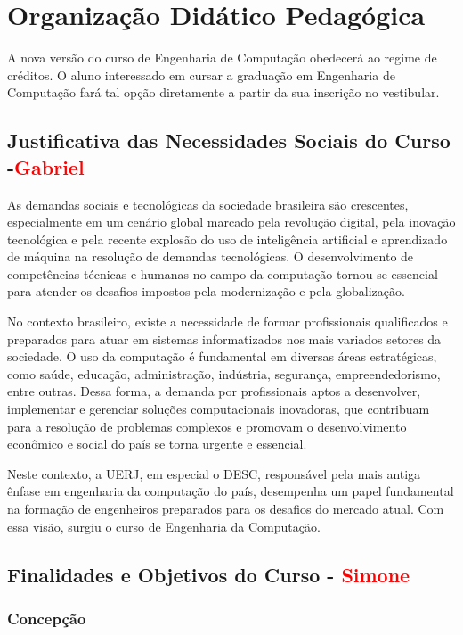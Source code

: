 
\chapter{Organização Didático Pedagógica}

A nova versão do curso de Engenharia de Computação obedecerá ao regime de créditos. O aluno interessado em cursar a graduação em Engenharia de Computação fará tal opção diretamente a partir da sua inscrição no vestibular.


\section{Justificativa das Necessidades Sociais do Curso -\textcolor{red}{Gabriel}}

As demandas sociais e tecnológicas da sociedade brasileira são crescentes, especialmente em um cenário global marcado pela revolução digital, pela inovação tecnológica e pela recente explosão do uso de inteligência artificial e aprendizado de máquina na resolução de demandas tecnológicas. O desenvolvimento de competências técnicas e humanas no campo da computação tornou-se essencial para atender os desafios impostos pela modernização e pela globalização.

No contexto brasileiro, existe a necessidade de formar profissionais qualificados e preparados para atuar em sistemas informatizados nos mais variados setores da sociedade. O uso da computação é fundamental em diversas áreas estratégicas, como saúde, educação, administração, indústria, segurança, empreendedorismo, entre outras. Dessa forma, a demanda por profissionais aptos a desenvolver, implementar e gerenciar soluções computacionais inovadoras, que contribuam para a resolução de problemas complexos e promovam o desenvolvimento econômico e social do país se torna urgente e essencial.

Neste contexto, a UERJ, em especial o DESC, responsável pela mais antiga ênfase em engenharia da computação do país, desempenha um papel fundamental na formação de engenheiros preparados para os desafios do mercado atual. Com essa visão, surgiu o curso de Engenharia da Computação.

\section{Finalidades e Objetivos do Curso - \textcolor{red}{Simone}}

\subsection{Concepção}

